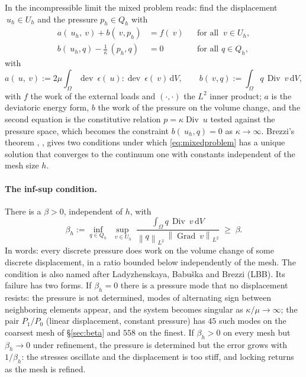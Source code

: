 \documentclass[11pt]{article}
\newcommand{\eps}{~\epsilon}
\newcommand{\Grad}{\operatorname{Grad}}
\newcommand{\Div}{\operatorname{Div}}
\newcommand{\dev}{\operatorname{dev}}
\newcommand{\norm}[1]{\left\lVert #1 \right\rVert}
\newcommand{\diff}{\,\mathrm{d}}
\theoremstyle{definition}
\theoremstyle{plain}
\begin{document}
In the incompressible limit the mixed problem reads: find the displacement
$~u_h \in U_h$ and the pressure $p_h \in Q_h$ with
\begin{equation}
  \label{eq:mixedproblem}
  \begin{aligned}
    a(~u_h, ~v) + b(~v, p_h) &= f(~v) && \text{for all } ~v \in U_h, \\
    b(~u_h, q) - \tfrac{1}{\kappa}\,(p_h, q) &= 0 && \text{for all } q \in Q_h,
  \end{aligned}
\end{equation}
with
\begin{equation}
  \label{eq:forms}
  a(~u, ~v) := 2\mu \int_\Omega \dev\eps(~u) : \dev\eps(~v) \diff V,
  \qquad
  b(~v, q) := \int_\Omega q \, \Div ~v \diff V,
\end{equation}
with $f$ the work of the external loads and $(\cdot,\cdot)$ the $L^2$ inner
product; $a$ is the deviatoric energy form, $b$ the work of the pressure on
the volume change, and the second equation is the constitutive relation
$p = \kappa \Div ~u$ tested against the pressure space, which becomes the
constraint $b(~u_h, q) = 0$ as $\kappa \to \infty$. Brezzi's theorem
\citep{Brezzi:1974}, \citep[Theorem~5.2.1 and \S5.2]{BoffiBrezziFortin:2013},
gives two conditions under which \eqref{eq:mixedproblem} has a unique
solution that converges to the continuum one with constants independent of
the mesh size $h$.

\paragraph{The inf-sup condition.} There is a $\beta > 0$, independent of
$h$, with
\begin{equation}
  \label{eq:infsup-background}
  \beta_h := \inf_{q \in Q_h}\;\sup_{~v \in U_h}\;
  \frac{\displaystyle\int_\Omega q \, \Div ~v \diff V}
       {\norm{q}_{L^2}\,\norm{\Grad ~v}_{L^2}}
  \;\ge\; \beta .
\end{equation}
In words: every discrete pressure does work on the volume change of some
discrete displacement, in a ratio bounded below independently of the mesh.
The condition is also named after Ladyzhenskaya, Babu\v{s}ka and Brezzi
(LBB). Its failure has two forms. If $\beta_h = 0$ there is a pressure mode
that no displacement resists: the pressure is not determined, modes of
alternating sign between neighboring elements appear, and the system
becomes singular as $\kappa/\mu \to \infty$; the pair $P_1/P_0$ (linear
displacement, constant pressure) has $45$ such modes on the coarsest mesh
of \S\ref{sec:beta} and $558$ on the finest. If $\beta_h > 0$ on every mesh
but $\beta_h \to 0$ under refinement, the pressure is determined but the
error grows with $1/\beta_h$: the stresses oscillate and the displacement
is too stiff, and locking returns as the mesh is refined.
\end{document}
